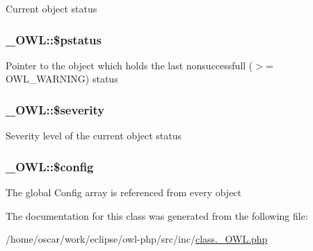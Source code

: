 Current object status \hypertarget{class__OWL_f30c6ce2c59df6da2ef0f7059be9231e}{
\subsubsection{\setlength{\rightskip}{0pt plus 5cm}\_\-OWL::\$pstatus}}
\label{class__OWL_f30c6ce2c59df6da2ef0f7059be9231e}


Pointer to the object which holds the last nonsuccessfull ($>$= OWL\_\-WARNING) status \hypertarget{class__OWL_d26b40a9dbbacb33e299b17826f8327c}{
\subsubsection{\setlength{\rightskip}{0pt plus 5cm}\_\-OWL::\$severity}}
\label{class__OWL_d26b40a9dbbacb33e299b17826f8327c}


Severity level of the current object status \hypertarget{class__OWL_f37a011667dda12fc417a68a6f3077d1}{
\subsubsection{\setlength{\rightskip}{0pt plus 5cm}\_\-OWL::\$config}}
\label{class__OWL_f37a011667dda12fc417a68a6f3077d1}


The global Config array is referenced from every object 

The documentation for this class was generated from the following file:\begin{CompactItemize}
\item 
/home/oscar/work/eclipse/owl-php/src/inc/\hyperlink{class_8__OWL_8php}{class.\_\-OWL.php}\end{CompactItemize}
